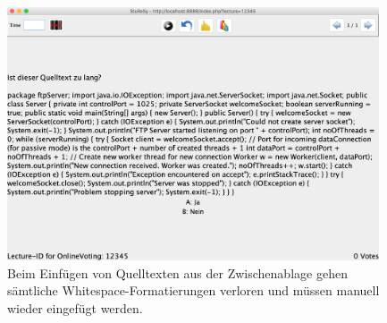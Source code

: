 \begin{figure}[H]
    \includegraphics[width=11cm]{chapter/bewertung/bilder/StuReSy_Problem_3.png}
    \centering
    \caption[Probleme bei der Darstellung von Quelltexten in StuReSy (3)]{Beim Einfügen von Quelltexten aus der Zwischenablage gehen sämtliche Whitespace-Formatierungen verloren und müssen manuell wieder eingefügt werden.}
    \label{abb:sturesy_problem_3}
\end{figure}
